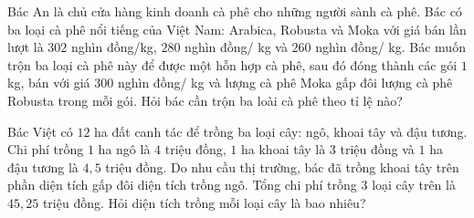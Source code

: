 \begin{bt}%
	Bác An là chủ cửa hàng kinh doanh cà phê cho những người sành cà phê. Bác có ba loại cà phê nổi tiếng của Việt Nam: Arabica, Robusta và Moka với giá bán lần lượt là $302$ nghìn đồng/kg, $280$ nghìn đồng/ kg và $260$ nghìn đồng/ kg. Bác muốn trộn ba loại cà phê này để được một hỗn hợp cà phê, sau đó đóng thành các gói $1$kg, bán với giá $300$ nghìn đồng/ kg và lượng cà phê Moka gấp đôi lượng cà phê Robusta trong mỗi gói. Hỏi bác cần trộn ba loài cà phê theo tỉ lệ nào?
\end{bt}
\begin{bt}%
		Bác Việt có $12$ ha đất canh tác để trồng ba loại cây: ngô, khoai tây và đậu tương. Chi phí trồng $1$ ha ngô là $4$ triệu đồng, $1$ ha khoai tây là $3$ triệu đồng và $1$ ha đậu tương là $4,5$ triệu đồng. Do nhu cầu thị trường, bác đã trồng khoai tây trên phần diện tích gấp đôi diện tích trồng ngô. Tổng chi phí trồng $3$ loại cây trên là $45,25$ triệu đồng. Hỏi diện tích trồng mỗi loại cây là bao nhiêu?
\end{bt}

